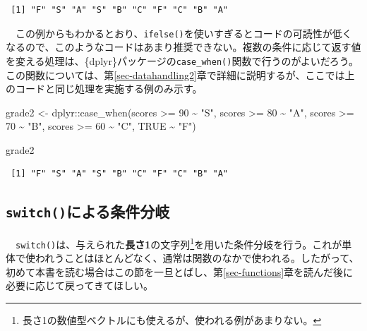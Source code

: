 \documentclass[
  a4paper,
  pandoc,
  ja=standard,
  jafont=haranoaji]{bxjsbook}
\newenvironment{Shaded}{\begin{snugshade}}{\end{snugshade}}
\newcommand{\ConstantTok}[1]{\textcolor[rgb]{0.56,0.35,0.01}{#1}}
\newcommand{\DecValTok}[1]{\textcolor[rgb]{0.68,0.00,0.00}{#1}}
\newcommand{\FunctionTok}[1]{\textcolor[rgb]{0.28,0.35,0.67}{#1}}
\newcommand{\NormalTok}[1]{\textcolor[rgb]{0.00,0.48,0.65}{#1}}
\newcommand{\OtherTok}[1]{\textcolor[rgb]{0.00,0.48,0.65}{#1}}
\newcommand{\SpecialCharTok}[1]{\textcolor[rgb]{0.37,0.37,0.37}{#1}}
\newcommand{\StringTok}[1]{\textcolor[rgb]{0.13,0.47,0.30}{#1}}
\begin{document}
\begin{verbatim}
 [1] "F" "S" "A" "S" "B" "C" "F" "C" "B" "A"
\end{verbatim}

　この例からもわかるとおり、\texttt{ifelse()}を使いすぎるとコードの可読性が低くなるので、このようなコードはあまり推奨できない。複数の条件に応じて返す値を変える処理は、\{dplyr\}パッケージの\texttt{case\_when()}関数で行うのがよいだろう。この関数については、第\ref{sec-datahandling2}章で詳細に説明するが、ここでは上のコードと同じ処理を実施する例のみ示す。

\begin{Shaded}
\begin{Highlighting}[numbers=left,,]
\NormalTok{grade2 }\OtherTok{\textless{}{-}}\NormalTok{ dplyr}\SpecialCharTok{::}\FunctionTok{case\_when}\NormalTok{(scores }\SpecialCharTok{\textgreater{}=} \DecValTok{90} \SpecialCharTok{\textasciitilde{}} \StringTok{"S"}\NormalTok{,}
\NormalTok{                           scores }\SpecialCharTok{\textgreater{}=} \DecValTok{80} \SpecialCharTok{\textasciitilde{}} \StringTok{"A"}\NormalTok{,}
\NormalTok{                           scores }\SpecialCharTok{\textgreater{}=} \DecValTok{70} \SpecialCharTok{\textasciitilde{}} \StringTok{"B"}\NormalTok{,}
\NormalTok{                           scores }\SpecialCharTok{\textgreater{}=} \DecValTok{60} \SpecialCharTok{\textasciitilde{}} \StringTok{"C"}\NormalTok{,}
                           \ConstantTok{TRUE}         \SpecialCharTok{\textasciitilde{}} \StringTok{"F"}\NormalTok{)}

\NormalTok{grade2}
\end{Highlighting}
\end{Shaded}

\begin{verbatim}
 [1] "F" "S" "A" "S" "B" "C" "F" "C" "B" "A"
\end{verbatim}

\hypertarget{switchux306bux3088ux308bux6761ux4ef6ux5206ux5c90}{%
\subsection{\texorpdfstring{\texttt{switch()}による条件分岐}{switch()による条件分岐}}\label{switchux306bux3088ux308bux6761ux4ef6ux5206ux5c90}}

　\texttt{switch()}は、与えられた\textbf{長さ1}の文字列\footnote{長さ1の数値型ベクトルにも使えるが、使われる例があまりない。}を用いた条件分岐を行う。これが単体で使われうことはほとんどなく、通常は関数のなかで使われる。したがって、初めて本書を読む場合はこの節を一旦とばし、第\ref{sec-functions}章を読んだ後に必要に応じて戻ってきてほしい。
\end{document}
